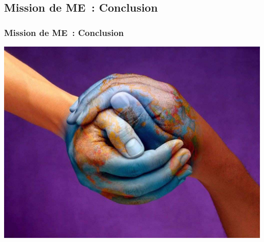 \subsection{Mission de ME~: Conclusion}
\begin{frame}
	\frametitle{Mission de ME~: Conclusion}
	\begin{center}
	\includegraphics[scale=0.22]{Images/Gk}
	\end{center}
\end{frame}



